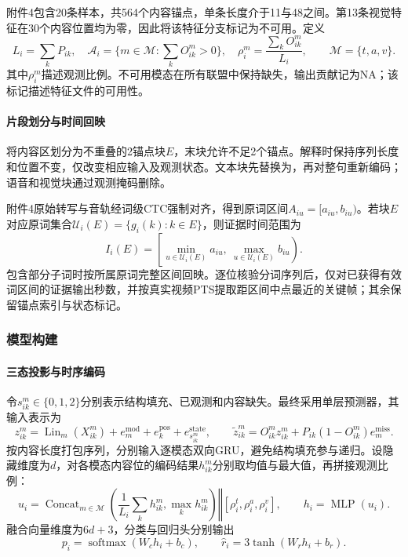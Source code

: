 附件4包含20条样本，共564个内容锚点，单条长度介于11与48之间。第13条视觉特征在30个内容位置均为零，因此将该特征分支标记为不可用。定义
\begin{equation}
L_i=\sum_kP_{ik},\quad \mathcal A_i=\{m\in\mathcal M:\sum_kO^m_{ik}>0\},\quad
\rho_i^m=\frac{\sum_kO^m_{ik}}{L_i},\qquad\mathcal M=\{t,a,v\}.
\end{equation}
其中$\rho_i^m$描述观测比例。不可用模态在所有联盟中保持缺失，输出贡献记为NA；该标记描述特征文件的可用性。

\paragraph{片段划分与时间回映}
将内容区划分为不重叠的2锚点块$E$，末块允许不足2个锚点。解释时保持序列长度和位置不变，仅改变相应输入及观测状态。文本块先替换为\file{[UNK]}，再对整句重新编码；语音和视觉块通过观测掩码删除。

附件4原始转写与音轨经词级CTC强制对齐，得到原词区间$A_{iu}=[a_{iu},b_{iu})$。若块$E$对应原词集合$\mathcal U_i(E)=\{g_i(k):k\in E\}$，则证据时间范围为
\begin{equation}
I_i(E)=\left[\min_{u\in\mathcal U_i(E)}a_{iu},\ \max_{u\in\mathcal U_i(E)}b_{iu}\right).
\end{equation}
包含部分子词时按所属原词完整区间回映。逐位核验分词序列后，仅对已获得有效词区间的证据输出秒数，并按真实视频PTS提取距区间中点最近的关键帧；其余保留锚点索引与状态标记。

\subsubsection{模型构建}
\paragraph{三态投影与时序编码}
令$s^m_{ik}\in\{0,1,2\}$分别表示结构填充、已观测和内容缺失。最终采用单层预测器，其输入表示为
\begin{equation}
z^m_{ik}=\operatorname{Lin}_m(X^m_{ik})+e_m^{\mathrm{mod}}+e_k^{\mathrm{pos}}+e^{\mathrm{state}}_{s^m_{ik}},\qquad
\widetilde z^m_{ik}=O^m_{ik}z^m_{ik}+P_{ik}(1-O^m_{ik})e_m^{\mathrm{miss}}.
\end{equation}
按内容长度打包序列，分别输入逐模态双向GRU，避免结构填充参与递归。设隐藏维度为$d$，对各模态内容位的编码结果$h^m_{ik}$分别取均值与最大值，再拼接观测比例：
\begin{equation}
u_i=\operatorname{Concat}_{m\in\mathcal M}\left(\frac1{L_i}\sum_kh^m_{ik},\max_kh^m_{ik}\right)
\mathbin\Vert[\rho_i^t,\rho_i^a,\rho_i^v],\qquad h_i=\operatorname{MLP}(u_i).
\end{equation}
融合向量维度为$6d+3$，分类与回归头分别输出
\begin{equation}
p_i=\operatorname{softmax}(W_ch_i+b_c),\qquad \widehat r_i=3\tanh(W_rh_i+b_r).
\end{equation}

